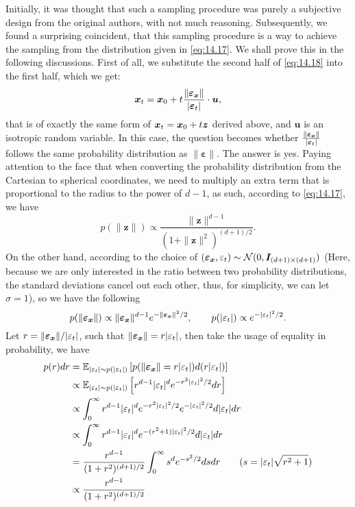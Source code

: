 Initially, it was thought that such a sampling procedure was purely a subjective design from the original authors, with not much reasoning. Subsequently, we found a surprising coincident, that this sampling procedure is a way to achieve the sampling from the distribution given in \cref{eq:14.17}. We shall prove this in the following discussions. First of all, we substitute the second half of \cref{eq:14.18} into the first half, which we get:
\begin{equation}
    \label{eq:14.19}
    \bm{x}_{t}=\bm{x}_0+t\frac{\|\bm{\varepsilon}_{\bm{x}}\|}{|\bm{\varepsilon}_{t}|}\cdot\bm{u},
\end{equation}
that is of exactly the same form of $\bm{x}_{t}=\bm{x}_0+t\bm{z}$ derived above, and $\bm{u}$ is an isotropic random variable. In this case, the question becomes whether $\frac{\|\bm{\varepsilon}_{\bm{x}}\|}{|\bm{\varepsilon}_{t}|}$ follows the same probability distribution as $\|\bm{\varepsilon}\|$. The answer is yes. Paying attention to the face that when converting the probability distribution from the Cartesian to spherical coordinates, we need to multiply an extra term that is proportional to the radius to the power of $d-1$, as such, according to \cref{eq:14.17}, we have 
\begin{equation}
    \label{eq:14.20}
    p(\|\bm{z}\|)\propto\frac{\|\bm{z}\|^{d-1}}{(1+\|\bm{z}\|^2)^{(d+1)/2}}.
\end{equation}
On the other hand, according to the choice of $(\bm{\varepsilon}_{\bm{x}},\varepsilon_t)\sim\mathcal{N}(0,\bm{I}_{(d+1)\times(d+1)})$ (Here, because we are only interested in the ratio between two probability distributions, the standard deviations cancel out each other, thus, for simplicity, we can let $\sigma=1$), so we have the following 
\begin{equation}
    \label{eq:14.21}
    p(\|\bm{\varepsilon}_{\bm{x}}\|)\propto \|\bm{\varepsilon}_{\bm{x}}\|^{d-1}e^{-\|\bm{\varepsilon}_{\bm{x}}\|^2/2}, \qquad p(|\varepsilon_t|)\propto e^{-|\varepsilon_t|^2/2}.
\end{equation}
Let $r=\|\bm{\varepsilon}_{\bm{x}}\|/|\varepsilon_t|$, such that $\|\bm{\varepsilon}_{\bm{x}}\|=r|\varepsilon_t|$, then take the usage of equality in probability, we have 
\begin{align}
    p(r)dr &=\mathbb{E}_{|\varepsilon_t|\sim p(|\varepsilon_t|)}\left[p(\|\bm{\varepsilon}_{\bm{x}}\|=r|\varepsilon_t|) d(r|\varepsilon_t|) \right] \nonumber\\
    &\propto \mathbb{E}_{|\varepsilon_t|\sim p(|\varepsilon_t|)}\left[ r^{d-1}|\varepsilon_t|^d e^{-r^2 |\varepsilon_t|^2/2} d r \right]\nonumber\\
    &\propto\int_0^\infty r^{d-1}|\varepsilon_t|^d e^{-r^2 |\varepsilon_t|^2/2}e^{- |\varepsilon_t|^2/2} d|\varepsilon_t|dr\nonumber\\
    &\propto \int_0^\infty r^{d-1}|\varepsilon_t|^d e^{- (r^2+1)|\varepsilon_t|^2/2} d|\varepsilon_t|dr\nonumber\\
    &=\frac{r^{d-1}}{(1+r^2)^{(d+1)/2}}\int_0^\infty s^d e^{-s^2/2}dsdr\qquad (s=|\varepsilon_t|\sqrt{r^2+1})\nonumber\\
    &\propto\frac{r^{d-1}}{(1+r^2)^{(d+1)/2}}\label{eq:14.22}
\end{align}
